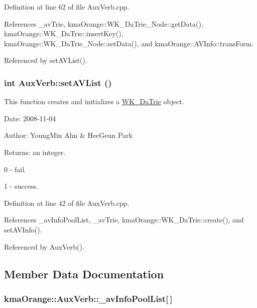 Definition at line 62 of file AuxVerb.cpp.

References \_\-avTrie, kmaOrange::WK\_\-DaTrie\_\-Node::getData(), kmaOrange::WK\_\-DaTrie::insertKey(), kmaOrange::WK\_\-DaTrie\_\-Node::setData(), and kmaOrange::AVInfo::transForm.

Referenced by setAVList().\hypertarget{classkmaOrange_1_1AuxVerb_db8f3afc0ca17e2277c55661c7654a6b}{
\subsubsection[{setAVList}]{\setlength{\rightskip}{0pt plus 5cm}int AuxVerb::setAVList ()}}
\label{classkmaOrange_1_1AuxVerb_db8f3afc0ca17e2277c55661c7654a6b}


This function creates and initializes a \hyperlink{classkmaOrange_1_1WK__DaTrie}{WK\_\-DaTrie} object. 

\begin{Desc}
\item[Date:]2008-11-04 \end{Desc}
\begin{Desc}
\item[Author:]YoungMin Ahn \& HeeGeun Park \end{Desc}
\begin{Desc}
\item[Returns:]an integer.\par
 0 - fail.\par
 1 - success. \end{Desc}


Definition at line 42 of file AuxVerb.cpp.

References \_\-avInfoPoolList, \_\-avTrie, kmaOrange::WK\_\-DaTrie::create(), and setAVInfo().

Referenced by AuxVerb().

\subsection{Member Data Documentation}
\hypertarget{classkmaOrange_1_1AuxVerb_701a88d643b13338185b36860a4b5a70}{
\subsubsection[{\_\-avInfoPoolList}]{ {\bf kmaOrange::AuxVerb::\_\-avInfoPoolList}\mbox{[}$\,$\mbox{]}}}
\label{classkmaOrange_1_1AuxVerb_701a88d643b13338185b36860a4b5a70}


